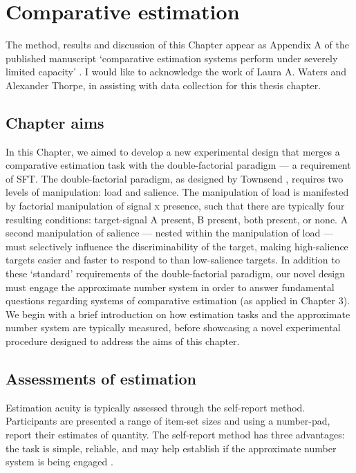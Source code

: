 \chapter{Comparative estimation} 

\label{Chapter 2}
\vspace{3cm}
\newpage


\noindent
The method, results and discussion of this Chapter appear as Appendix A of the published manuscript `comparative estimation systems perform under severely limited capacity' \cite{garrett2019comparative}. I would like to acknowledge the work of Laura A. Waters and Alexander Thorpe, in assisting with data collection for this thesis chapter. 

\color{\Red}
\section{Chapter aims}
In this Chapter, we aimed to develop a new experimental design that merges a comparative estimation task with the double-factorial paradigm --- a requirement of SFT. The double-factorial paradigm, as designed by Townsend \citeyear{Townsend_1995}, requires two levels of manipulation: load and salience. The manipulation of load is manifested by factorial manipulation of signal x presence, such that there are typically four resulting conditions: target-signal A present, B present, both present, or none. A second manipulation of salience --- nested within the manipulation of load --- must selectively influence the discriminability of the target, making high-salience targets easier and faster to respond to than low-salience targets. In addition to these `standard' requirements of the double-factorial paradigm, our novel design must engage the approximate number system in order to answer fundamental questions regarding systems of comparative estimation (as applied in Chapter 3). We begin with a brief introduction on how estimation tasks and the approximate number system are typically measured, before showcasing a novel experimental procedure designed to address the aims of this chapter.

\section{Assessments of estimation}
Estimation acuity is typically assessed through the self-report method. Participants are presented a range of item-set sizes and using a number-pad, report their estimates of quantity. The self-report method has three advantages: the task is simple, reliable, and may help establish if the approximate number system is being engaged \cite{Whalen1999, Cordes2001}.

